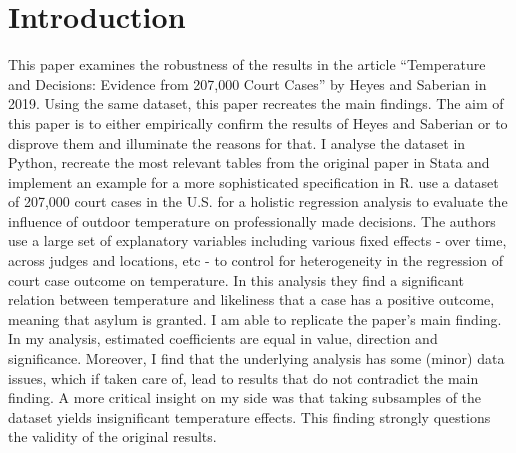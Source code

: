 \documentclass[11pt]{article}
\begin{document}
	\section{Introduction}
	This paper examines the robustness of the results in the article “Temperature and Decisions: Evidence from 207,000 Court Cases” by Heyes and Saberian in 2019. Using the same dataset, this paper recreates the main findings. The aim of this paper is to either empirically confirm the results of Heyes and Saberian or to disprove them and illuminate the reasons for that. I analyse the dataset in Python, recreate the most relevant tables from the original paper in Stata and implement an example for a more sophisticated specification in R.
	\newline \cite{Heyes.2019} use a dataset of 207,000 court cases in the U.S. for a holistic regression analysis to evaluate the influence of outdoor temperature on professionally made decisions. The authors use a large set of explanatory variables including various fixed effects - over time, across judges and locations, etc - to control for heterogeneity in the regression of court case outcome on temperature. In this analysis they find a significant relation between temperature and likeliness that a case has a positive outcome, meaning that asylum is granted.
	\newline I am able to replicate the paper’s main finding. In my analysis, estimated coefficients are equal in value, direction and significance. Moreover, I find that the underlying analysis has some (minor) data issues, which if taken care of, lead to results that do not contradict the main finding. A more critical insight on my side was that taking subsamples of the dataset yields insignificant temperature effects. This finding strongly questions the validity of the original results. 
\end{document}
